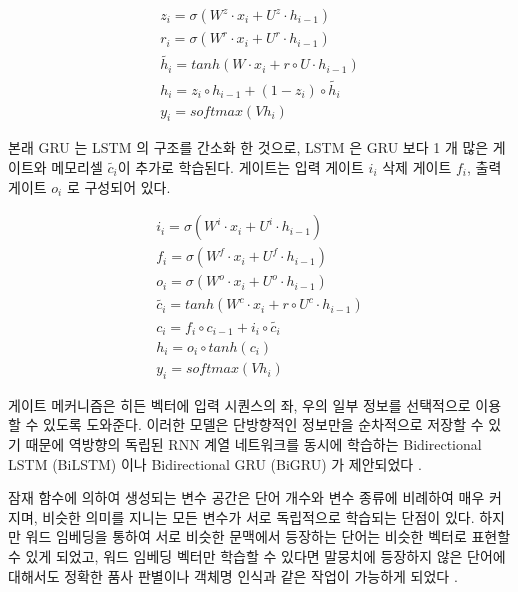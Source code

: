 \documentclass[11pt]{article}
\begin{document}
\begin{equation}
  \label{eq:gru}
  \begin{aligned}
  z_i = \sigma(W^z \cdot x_i + U^z \cdot h_{i-1}) \\
  r_i = \sigma(W^r \cdot x_i + U^r \cdot h_{i-1}) \\
  \tilde{h_i} = tanh \left( W \cdot x_i + r \circ U \cdot h_{i-1}\right) \\
  h_i = z_i \circ h_{i-1} + (1 - z_i) \circ \tilde{h_i} \\
  y_i = softmax(Vh_i)
  \end{aligned}
\end{equation}

본래 GRU 는 LSTM 의 구조를 간소화 한 것으로, LSTM 은 GRU 보다 1 개 많은 게이트와 메모리셀 $\tilde{c_i}$이 추가로 학습된다.
게이트는 입력 게이트 $i_i$ 삭제 게이트 $f_i$, 출력 게이트 $o_i$ 로 구성되어 있다.

\begin{equation}
  \label{eq:lstm}
  \begin{aligned}
  i_i = \sigma(W^i \cdot x_i + U^i \cdot h_{i-1}) \\
  f_i = \sigma(W^f \cdot x_i + U^f \cdot h_{i-1}) \\
  o_i = \sigma(W^o \cdot x_i + U^o \cdot h_{i-1}) \\
  \tilde{c_i} = tanh \left( W^c \cdot x_i + r \circ U^c \cdot h_{i-1}\right) \\
  c_i = f_i \circ c_{i-1} + i_i \circ \tilde{c_i} \\
  h_i = o_i \circ tanh (c_i) \\
  y_i = softmax(Vh_i)
  \end{aligned}
\end{equation}

게이트 메커니즘은 히든 벡터에 입력 시퀀스의 좌, 우의 일부 정보를 선택적으로 이용할 수 있도록 도와준다.
이러한 모델은 단방향적인 정보만을 순차적으로 저장할 수 있기 때문에 역방향의 독립된 RNN 계열 네트워크를 동시에 학습하는 Bidirectional LSTM (BiLSTM) 이나 Bidirectional GRU (BiGRU) 가 제안되었다 \citep{graves2005bidirectional}.

잠재 함수에 의하여 생성되는 변수 공간은 단어 개수와 변수 종류에 비례하여 매우 커지며, 비슷한 의미를 지니는 모든 변수가 서로 독립적으로 학습되는 단점이 있다.
하지만 워드 임베딩을 통하여 서로 비슷한 문맥에서 등장하는 단어는 비슷한 벡터로 표현할 수 있게 되었고, 워드 임베딩 벡터만 학습할 수 있다면 말뭉치에 등장하지 않은 단어에 대해서도 정확한 품사 판별이나 객체명 인식과 같은 작업이 가능하게 되었다 \citep{collobert2011natural, lample2016neural}.
\end{document}
